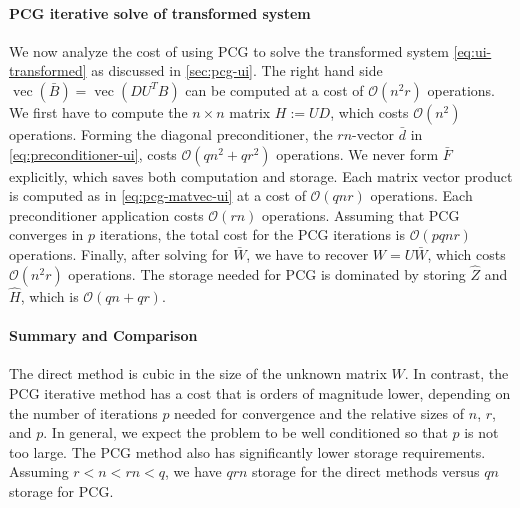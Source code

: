 \documentclass{article}
\DeclareMathOperator{\vecop}{vec}
\theoremstyle{plain} %
\begin{document}
\paragraph{PCG iterative solve of transformed system}
We now analyze the cost of using PCG to solve the transformed system \cref{eq:ui-transformed} as discussed in \cref{sec:pcg-ui}.
The right hand side $\vecop(\bar{B}) = \vecop(D U^T B)$ can be computed at a cost of $\mathcal{O}(n^2 r)$ operations.
We first have to compute the $n \times n$ matrix $H := U D$, which costs $\mathcal{O}(n^2)$ operations.
Forming the diagonal preconditioner, the $rn$-vector $\bar{d}$ in \cref{eq:preconditioner-ui}, costs $\mathcal{O}(qn^2 + qr^2)$ operations.
We never form $\bar{F}$ explicitly, which saves both computation and storage.
Each matrix vector product is computed as in \cref{eq:pcg-matvec-ui} at a cost of $\mathcal{O}(q n r)$ operations.
Each preconditioner application costs $\mathcal{O}(r n)$ operations.
Assuming that PCG converges in $p$ iterations, the total cost for the PCG iterations is $\mathcal{O}(p q n r)$ operations.
Finally, after solving for $\bar{W}$, we have to recover $W = U \bar{W}$, which costs $\mathcal{O}(n^2 r)$ operations.
The storage needed for PCG is dominated by storing $\hat{Z}$ and $\hat{H}$, which is $\mathcal{O}(qn + qr)$.

\paragraph{Summary and Comparison}

The direct method is cubic in the size of the unknown matrix $W$.
In contrast, the PCG iterative method has a cost that is orders of magnitude lower, depending on the number of iterations $p$ needed for convergence and the relative sizes of $n$, $r$, and $p$. In general, we expect the problem to be well conditioned
so that $p$ is not too large.
The PCG method also has significantly lower storage requirements. Assuming $r < n < rn < q$, we have $qrn$ storage for the direct methods versus $qn$ storage for PCG.
\end{document}
